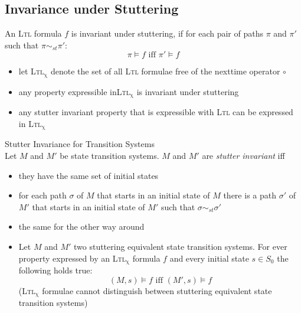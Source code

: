 \documentclass[a4paper, 10pt]{article}
\begin{document}
\subsection*{Invariance under Stuttering}
\begin{shaded}
    An \textsc{Ltl} formula $f$ is invariant under stuttering, if for each pair of paths $\pi$ and $\pi'$ such that $\pi\sim_{st}\pi'$: \[ \pi\models f \textrm{ iff } \pi'\models f \]
    \begin{itemize}
        \item let \textsc{Ltl}$_\upchi$ denote the set of all \textsc{Ltl} formulae free of the nexttime operator $\circ$
        \item any property expressible in\textsc{Ltl}$_\upchi$ is invariant under stuttering
        \item any stutter invariant property that is expressible with \textsc{Ltl} can be expressed in \textsc{Ltl}$_\upchi$
    \end{itemize}
\end{shaded}
\begin{shaded}
    Stutter Invariance for Transition Systems\\
    Let $M$ and $M'$ be state transition systems. $M$ and $M'$ are \emph{stutter invariant} iff
    \begin{itemize}
        \item they have the same set of initial states
        \item for each path $\sigma$ of $M$ that starts in an initial state of $M$ there is a path $\sigma'$ of $M'$ that starts in an initial state of $M'$ such that $\sigma\sim_{st}\sigma'$
        \item the same for the other way around
        \item Let $M$ and $M'$ two stuttering equivalent state transition systems. For ever property expressed by an \textsc{Ltl}$_\upchi$ formula $f$ and every initial state $s\in S_0$ the following holds true:
        \[ (M,s)\models f\textrm{ iff } (M',s)\models f \]
        {\tiny (\textsc{Ltl}$_\upchi$ formulae cannot distinguish between stuttering equivalent state transition systems)}
    \end{itemize}
\end{shaded}
\end{document}
